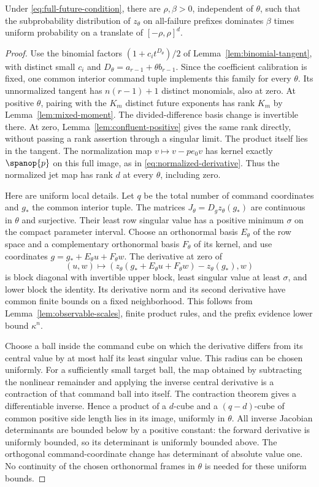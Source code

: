 \begin{lemma}\label{lem:uniform-patch}
Under \eqref{eq:full-future-condition}, there are $\rho,\beta>0$,
independent of $\theta$, such that the subprobability distribution of
$z_\theta$ on all-failure prefixes dominates $\beta$ times uniform
probability on a translate of $[-\rho,\rho]^d$.
\end{lemma}
\begin{proof}
Use the binomial factors $(1+c_it^{D_\theta})/2$ of
Lemma~\ref{lem:binomial-tangent}, with distinct small $c_i$ and
$D_\theta=a_{r-1}+\theta b_{r-1}$. Since the coefficient calibration is
fixed, one common interior command tuple implements this family for every
$\theta$. Its unnormalized tangent has $n(r-1)+1$ distinct monomials,
also at zero. At positive $\theta$, pairing with the $K_m$ distinct
future exponents has rank $K_m$ by Lemma~\ref{lem:mixed-moment}.
The divided-difference basis change is invertible there. At zero,
Lemma~\ref{lem:confluent-positive} gives the same rank directly, without
passing a rank assertion through a singular limit. The product itself
lies in the tangent. The normalization map
$v\mapsto v-p e_0v$ has kernel exactly $\spanop\{p\}$ on this full
image, as in \eqref{eq:normalized-derivative}. Thus the normalized jet
map has rank $d$ at every $\theta$, including zero.

Here are uniform local details. Let $q$ be the total number of command
coordinates and $g_*$ the common interior tuple. The matrices
$J_\theta=D_gz_\theta(g_*)$ are continuous in $\theta$ and surjective.
Their least row singular value has a positive minimum $\sigma$ on the
compact parameter interval. Choose an orthonormal basis $E_\theta$ of
the row space and a complementary orthonormal basis $F_\theta$ of its
kernel, and use coordinates $g=g_*+E_\theta u+F_\theta w$.
The derivative at zero of
\[
 (u,w)\longmapsto
       (z_\theta(g_*+E_\theta u+F_\theta w)-z_\theta(g_*),w)
\]
is block diagonal with invertible upper block, least singular value at
least $\sigma$, and lower block the identity. Its derivative norm and
its second derivative have common finite bounds on a fixed neighborhood.
This follows from Lemma~\ref{lem:observable-scales}, finite product
rules, and the prefix evidence lower bound $\kappa^n$.

Choose a ball inside the command cube on which the derivative differs
from its central value by at most half its least singular value. This
radius can be chosen uniformly. For a sufficiently small target ball,
the map obtained by subtracting the nonlinear remainder and applying the
inverse central derivative is a contraction of that command ball into
itself. The contraction theorem gives a differentiable inverse. Hence a
product of a $d$-cube and a $(q-d)$-cube of common positive side length
lies in its image, uniformly in $\theta$. All inverse Jacobian
determinants are bounded below by a positive constant: the forward
derivative is uniformly bounded, so its determinant is uniformly bounded
above. The orthogonal command-coordinate change has determinant of
absolute value one. No continuity of the chosen orthonormal frames in
$\theta$ is needed for these uniform bounds.


\end{proof}
